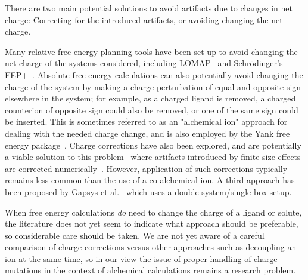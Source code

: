 \documentclass[9pt,bestpractices]{livecoms}
\begin{document}
There are two main potential solutions to avoid artifacts due to changes in net charge: Correcting for the introduced artifacts, or avoiding changing the net charge.

Many relative free energy planning tools have been set up to avoid changing the net charge of the systems considered, including LOMAP~\cite{liu2013lead} and Schr\"{o}dinger's FEP+~\cite{wang2015accurate}. Absolute free energy calculations can also potentially avoid changing the charge of the system by making a charge perturbation of equal and opposite sign elsewhere in the system; for example, as a charged ligand is removed, a charged counterion of opposite sign could also be removed, or one of the same sign could be inserted. This is sometimes referred to as an "alchemical ion" approach for dealing with the needed charge change, and is also employed by the Yank free energy package~\cite{wang2013identifying}.
Charge corrections have also been explored, and are potentially a viable solution to this problem~\cite{mey2018impact} where artifacts introduced by finite-size effects are corrected numerically~\cite{chen2018accurate, ohlknecht2020correcting}. However, application of such corrections typically remains less common than the use of a co-alchemical ion. A third approach has been proposed by Gapsys et al.~\cite{gapsys2015calculation} which uses a double-system/single box setup. 

When free energy calculations \emph{do} need to change the charge of a ligand or solute, the literature does not yet seem to indicate what approach should be preferable, so considerable care should be taken.
We are not yet aware of a careful comparison of charge corrections versus other approaches such as decoupling an ion at the same time, so in our view the issue of proper handling of charge mutations in the context of alchemical calculations remains a research problem.
\end{document}
